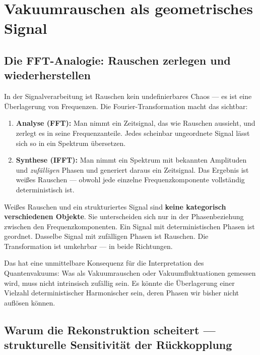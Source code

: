 \section{Vakuumrauschen als geometrisches Signal}

\subsection{Die FFT-Analogie: Rauschen zerlegen und wiederherstellen}

In der Signalverarbeitung ist Rauschen kein undefinierbares Chaos — es ist eine
Überlagerung von Frequenzen. Die Fourier-Transformation macht das sichtbar:

\begin{enumerate}
    \item \textbf{Analyse (FFT):} Man nimmt ein Zeitsignal, das wie Rauschen
    aussieht, und zerlegt es in seine Frequenzanteile. Jedes scheinbar
    ungeordnete Signal lässt sich so in ein Spektrum übersetzen.
    \item \textbf{Synthese (IFFT):} Man nimmt ein Spektrum mit bekannten
    Amplituden und \emph{zufälligen} Phasen und generiert daraus ein Zeitsignal.
    Das Ergebnis ist weißes Rauschen — obwohl jede einzelne Frequenzkomponente
    vollständig deterministisch ist.
\end{enumerate}

\begin{keypoint}
Weißes Rauschen und ein strukturiertes Signal sind \textbf{keine kategorisch
verschiedenen Objekte}. Sie unterscheiden sich nur in der Phasenbeziehung zwischen
den Frequenzkomponenten. Ein Signal mit deterministischen Phasen ist geordnet.
Dasselbe Signal mit zufälligen Phasen ist Rauschen.
Die Transformation ist umkehrbar — in beide Richtungen.
\end{keypoint}

Das hat eine unmittelbare Konsequenz für die Interpretation des Quantenvakuums:
Was als Vakuumrauschen oder Vakuumfluktuationen gemessen wird, muss nicht
intrinsisch zufällig sein. Es könnte die Überlagerung einer Vielzahl
deterministischer Harmonischer sein, deren Phasen wir bisher nicht auflösen können.

\subsection{Warum die Rekonstruktion scheitert — strukturelle Sensitivität der Rückkopplung}

